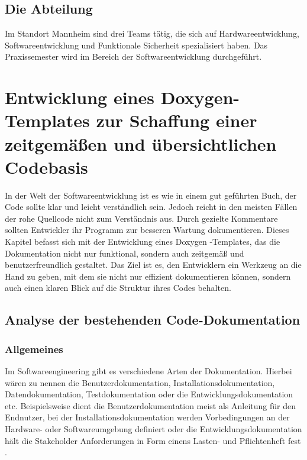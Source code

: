 \documentclass[11pt,a4paper]{report}
\begin{document}
\section{Die Abteilung}

Im Standort Mannheim sind drei Teams tätig, die sich auf Hardwareentwicklung, Softwareentwicklung und Funktionale Sicherheit spezialisiert haben. Das Praxissemester wird im Bereich der Softwareentwicklung durchgeführt.

\chapter{Entwicklung eines Doxygen-Templates zur Schaffung einer
zeitgemäßen und übersichtlichen Codebasis} \label{chap:ppv}

In der Welt der Softwareentwicklung ist es wie in einem gut geführten Buch, der Code sollte
klar und leicht verständlich sein. Jedoch reicht in den meisten Fällen der rohe Quellcode nicht
zum Verständnis aus. Durch gezielte Kommentare sollten Entwickler ihr Programm zur besseren Wartung
dokumentieren. Dieses Kapitel befasst sich mit der Entwicklung eines 
Doxygen -Templates, das die Dokumentation nicht nur funktional, sondern auch zeitgemäß und
benutzerfreundlich gestaltet. Das Ziel ist es, den Entwicklern ein Werkzeug an die Hand zu 
geben, mit dem sie nicht nur effizient dokumentieren können, sondern auch einen klaren Blick auf
die Struktur ihres Codes behalten.

\section{Analyse der bestehenden Code-Dokumentation} \label{sec:was}

\subsection{Allgemeines}
Im Softwareengineering gibt es verschiedene Arten der Dokumentation. Hierbei wären zu nennen die 
Benutzerdokumentation, Installationsdokumentation, Datendokumentation, Testdokumentation oder die 
Entwicklungsdokumentation etc.\cite{Beningo} Beispielsweise dient die Benutzerdokumentation meist als Anleitung für den Endnutzer, bei der Installationsdokumentation werden Vorbedingungen an der Hardware- oder Softwareumgebung definiert oder die Entwicklungsdokumentation hält die Stakeholder Anforderungen in Form einens Lasten- und Pflichtenheft fest \cite{Lehner}.
\end{document}
